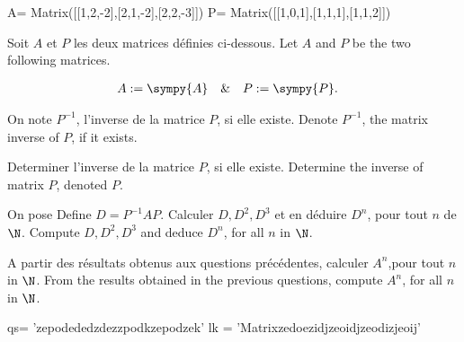 \begin{sympycode}
A= Matrix([[1,2,-2],[2,1,-2],[2,2,-3]]) 
P= Matrix([[1,0,1],[1,1,1],[1,1,2]])  
\end{sympycode}

\begin{comment}
$\N$
\end{comment}




\iffrancais
Soit $A$ et $P$ les deux matrices définies ci-dessous.
\else
Let $A$ and $P$ be the two following matrices.
\fi




\begin{align}
&A:=  \sympy{A}&
& \& & 
&P:=  \sympy{P}.&
\end{align}








\iffrancais
On note $P^{-1}$, l'inverse de la matrice $P$, si elle existe.
\else
Denote  $P^{-1}$, the matrix inverse of $P$, if it exists.
\fi

\ben

\item 
\iffrancais
Determiner l'inverse de la matrice $P$, si elle existe.
\else
Determine the inverse of matrix $P$, denoted $P$.
\fi



\item
\iffrancais
On pose 
\else
Define
\fi
$D=P^{-1}AP$. 
%
%
\iffrancais
Calculer $D, D^{2}, D^{3}$ et en déduire $D^{n}$, pour tout $n$ de $\N$.
\else
Compute $D, D^{2}, D^{3}$ and deduce $D^{n}$, for all $n$ in $\N$.
\fi


\item
\iffrancais
A partir des résultats obtenus aux questions précédentes, calculer $A^{n}$,pour tout  $n$ in $\N$.
\else
From the results obtained in the previous questions, compute  $A^{n}$, for all $n$ in $\N$.
\fi


\begin{sympycode}
qs= 'zepodededzdezzpodkzepodzek'
lk = 'Matrixzedoezidjzeoidjzeodizjeoij'
\end{sympycode}


\een







